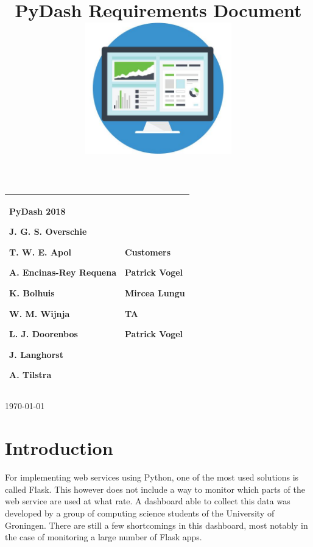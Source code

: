 

\title{ PyDash Requirements Document  \\ \includegraphics[width=2.50746in,height=2.26563in]{media/image2.jpg}}

\begin{longtable}[]{@{}ll@{}}
\toprule
\endhead
\begin{minipage}[t]{0.47\columnwidth}\raggedright
\textbf{PyDash 2018}

J. G. S. Overschie

T. W. E. Apol

A. Encinas-Rey Requena

K. Bolhuis

W. M. Wijnja

L. J. Doorenbos

J. Langhorst

A. Tilstra\strut
\end{minipage} & \begin{minipage}[t]{0.47\columnwidth}\raggedright
\textbf{Customers}

Patrick Vogel

Mircea Lungu

\textbf{TA}

Patrick Vogel\strut
\end{minipage}\tabularnewline
\bottomrule
\end{longtable}

\today

\pagebreak

\tableofcontents


\hypertarget{introduction}{%
\section{Introduction}\label{introduction}}

For implementing web services using Python, one of the most used
solutions is called Flask. This however does not include a way to
monitor which parts of the web service are used at what rate. A
dashboard able to collect this data was developed by a group of
computing science students of the University of Groningen. There are
still a few shortcomings in this dashboard, most notably in the case of
monitoring a large number of Flask apps.

